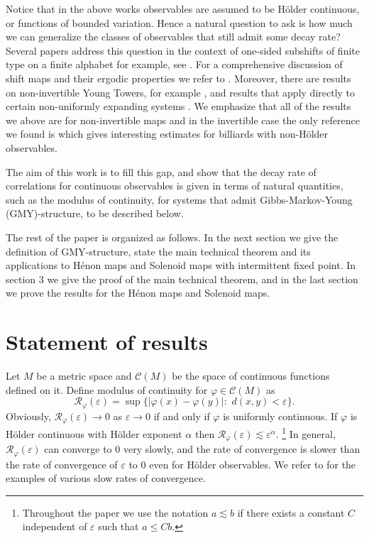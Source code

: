 \documentclass[a4paper,12pt]{amsart}
\numberwithin{equation}{section}
\begin{document}
Notice that in the above works observables are assumed to be
H\"older continuous, or functions of bounded variation. Hence a
natural question to ask is how much we can generalize the classes of
observables that still admit some decay rate?  Several papers
address this question  in the context of one-sided subshifts of
finite type on a finite alphabet for example, see \cite{BFG, FL,
KMS, I, P}. For a comprehensive discussion of shift maps and their
ergodic properties we refer to \cite{Ba}. Moreover, there are
results on non-invertible Young Towers,  for example \cite{BM, KMS,
Ly, M}, and results that apply directly to certain non-uniformly
expanding systems \cite{PY}. We emphasize that all of the results we
above are for non-invertible maps and in the invertible case the
only reference we found is \cite{Z} which gives interesting
estimates for billiards with non-H\"older observables.

The aim of this work is to fill this gap, and show that the decay
rate of correlations for continuous observables is given in terms of
natural quantities, such as the modulus of continuity,  for systems
that admit Gibbs-Markov-Young (GMY)-structure, to be described
below.

The rest of the paper is organized as follows. In the next section
we give the definition of GMY-structure, state the main technical
theorem and its applications to H\'enon maps and Solenoid maps with
intermittent fixed point. In section 3 we give the proof of the main
technical theorem, and in the last section we prove the results for
the H\'enon maps and Solenoid maps.

\section{Statement of results}

Let $M$ be  a metric space and $\mathcal C(M)$ be the space of continuous
functions defined on it.  Define modulus of continuity for
$\varphi\in\mathcal  C(M)$ as
$$\mathcal{R}_\varphi(\varepsilon)=\sup\{|\varphi(x)-\varphi(y)|:\,\,
d(x, y)<\varepsilon\}.
$$
Obviously, ${\mathcal{R}_\varphi(\varepsilon)}\to 0 $ as $\varepsilon\to 0$ if and only if
$\varphi$ is uniformly continuous. If $\varphi$ is H\"older
continuous  with   H\"older exponent $\alpha$ then  ${\mathcal{R}_\varphi(\varepsilon)}\lesssim
\varepsilon^\alpha.$  \footnote{Throughout the paper we use the
notation $a\lesssim b$ if there exists a constant $C$ independent of
$\varepsilon$ such that $a\le Cb.$}  In general, ${\mathcal{R}_\varphi(\varepsilon)}$ can converge
to $0$ very slowly, and the rate of convergence is slower than the
rate of convergence of $\varepsilon$ to $0$ even for H\"older
observables. We refer to \cite{Hol} for  the examples of various
slow rates of convergence.
\end{document}

